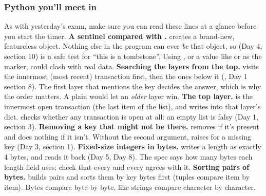 \documentclass[10pt,a4paper]{article}
\begin{document}
\subsubsection{Python you’ll meet in }
As with yesterday’s exam, make sure you can read these lines at a glance before you start the timer.
\textbf{A sentinel compared with .}  creates a brand-new, featureless object. Nothing else in the program can ever \emph{be} that object, so  (Day 4, section 10) is a safe test for “this is a tombstone”. Using \code{=\allowbreak{}=\allowbreak{}}, or a value like  or \code{\textquotedbl{}\textquotedbl{}} as the marker, could clash with real data.
\textbf{Searching the layers from the top.}  visits the innermost (most recent) transaction first, then the ones below it (, Day 1 section 8). The first layer that mentions the key decides the answer, which is why the order matters. A plain  would let an \emph{older} layer win.
\textbf{The top layer.}  is the innermost open transaction (the last item of the list), and  writes into that layer’s dict.  checks whether any transaction is open at all: an empty list is falsy (Day 1, section 3).
\textbf{Removing a key that might not be there.}  removes  if it’s present and does nothing if it isn’t. Without the second argument,  raises  for a missing key (Day 3, section 1).
\textbf{Fixed-size integers in bytes.}  writes a length as exactly 4 bytes, and  reads it back (Day 5, Day 8). The spec says how many bytes each length field uses; check that every  and every  agrees with it.
\textbf{Sorting pairs of bytes.}  builds  pairs and sorts them by key bytes first (tuples compare item by item). Bytes compare byte by byte, like strings compare character by character.
\end{document}
